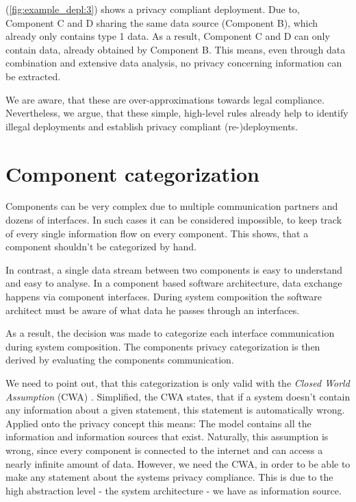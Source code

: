 (\autoref{fig:example_depl:3}) shows a privacy compliant deployment. Due to, Component C and D sharing the same data source (Component B), which already only contains type 1 data. As a result, Component C and D can only contain data, already obtained by Component B. This means, even through data combination and extensive data analysis, no privacy concerning information can be extracted.

We are aware, that these are over-approximations towards legal compliance. Nevertheless, we argue, that these simple, high-level rules already help to identify illegal deployments and establish privacy compliant (re-)deployments.


\section{Component categorization}
\label{sec:PrivacyConcept:comp_cat}

Components can be very complex due to multiple communication partners and dozens of interfaces. In such cases it can be considered impossible, to keep track of every single information flow on every component. This shows, that a component shouldn't be categorized by hand.

In contrast, a single data stream between two components is easy to understand and easy to analyse. In a component based software architecture, data exchange happens via component interfaces. During system composition the software architect must be aware of what data he passes through an interfaces.

As a result, the decision was made to categorize each interface communication during system composition. The components privacy categorization is then derived by evaluating the components communication.

We need to point out, that this categorization is only valid with the \textit{Closed World Assumption} (CWA) \cite{Sequeda.CWA}. Simplified, the CWA states, that if a system doesn't contain any information about a given statement, this statement is automatically wrong. Applied onto the privacy concept this means: The model contains all the information and information sources that exist. Naturally, this assumption is wrong, since every component is connected to the internet and can access a nearly infinite amount of data. However, we need the CWA, in order to be able to make any statement about the systems privacy compliance. This is due to the high abstraction level - the system architecture - we have as information source.


